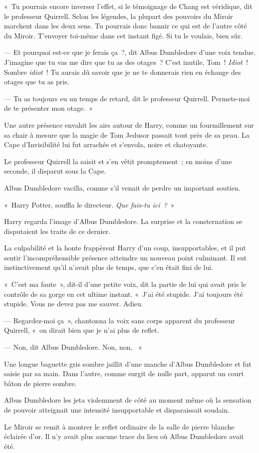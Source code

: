 «~Tu pourrais encore inverser l'effet, si le témoignage de Chang est véridique, dit le professeur Quirrell. Selon les légendes, la plupart des pouvoirs du Miroir marchent dans les deux sens. Tu pourrais donc bannir ce qui est de l'autre côté du Miroir. T'envoyer toi-même dans cet instant figé. Si tu le voulais, bien sûr.

--- Et pourquoi est-ce que je ferais ça~?, dit Albus Dumbledore d'une voix tendue. J'imagine que tu vas me dire que tu as des otages~? C'est inutile, Tom~! \emph{Idiot}~! Sombre \emph{idiot}~! Tu aurais dû savoir que je ne te donnerais rien en échange des otages que tu as pris.

--- Tu as toujours eu un temps de retard, dit le professeur Quirrell. Permets-moi de te présenter mon otage.~»

Une autre présence envahit les airs autour de Harry, comme un fourmillement sur sa chair à mesure que la magie de Tom Jedusor passait tout près de sa peau. La Cape d'Invisibilité lui fut arrachée et s'envola, noire et chatoyante.

Le professeur Quirrell la saisit et s'en vêtit promptement~; en moins d'une seconde, il disparut sous la Cape.

Albus Dumbledore vacilla, comme s'il venait de perdre un important soutien.

«~Harry Potter, souffla le directeur. \emph{Que fais-tu ici~?}~»

Harry regarda l'image d'Albus Dumbledore. La surprise et la consternation se disputaient les traits de ce dernier.

La culpabilité et la honte frappèrent Harry d'un coup, insupportables, et il put sentir l'incompréhensible présence atteindre un nouveau point culminant. Il sut instinctivement qu'il n'avait plus de temps, que c'en était fini de lui.

«~C'est ma faute~», dit-il d'une petite voix, dit la partie de lui qui avait pris le contrôle de sa gorge en cet ultime instant. «~J'ai été stupide. J'ai toujours été stupide. Vous ne devez pas me sauver. Adieu.

--- Regardez-moi ça~», chantonna la voix sans corps apparent du professeur Quirrell, «~on dirait bien que je n'ai plus de reflet.

--- Non, dit Albus Dumbledore. Non, non, ~»~

Une longue baguette gris sombre jaillit d'une manche d'Albus Dumbledore et fut saisie par sa main. Dans l'autre, comme surgit de nulle part, apparut un court bâton de pierre sombre.

Albus Dumbledore les jeta violemment de côté au moment même où la sensation de pouvoir atteignait une intensité insupportable et disparaissait soudain.

Le Miroir se remit à montrer le reflet ordinaire de la salle de pierre blanche éclairée d'or. Il n'y avait plus aucune trace du lieu où Albus Dumbledore avait été.
